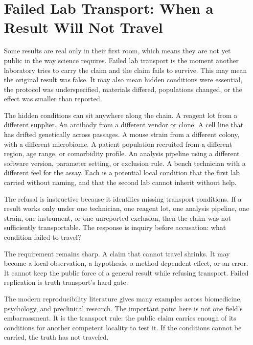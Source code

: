 \section{Failed Lab Transport: When a Result Will Not Travel}

Some results are real only in their first room, which means they are not
yet public in the way science requires. Failed lab transport is the
moment another laboratory tries to carry the claim and the claim fails
to survive. This may mean the original result was false. It may also
mean hidden conditions were essential, the protocol was underspecified,
materials differed, populations changed, or the effect was smaller than
reported.

The hidden conditions can sit anywhere along the chain. A reagent lot
from a different supplier. An antibody from a different vendor or clone.
A cell line that has drifted genetically across passages. A mouse strain
from a different colony, with a different microbiome. A patient
population recruited from a different region, age range, or comorbidity
profile. An analysis pipeline using a different software version,
parameter setting, or exclusion rule. A bench technician with a
different feel for the assay. Each is a potential local condition that
the first lab carried without naming, and that the second lab cannot
inherit without help.

The refusal is instructive because it identifies missing transport
conditions. If a result works only under one technician, one reagent
lot, one analysis pipeline, one strain, one instrument, or one
unreported exclusion, then the claim was not sufficiently transportable.
The response is inquiry before accusation: what condition failed to
travel?

The requirement remains sharp. A claim that cannot travel shrinks. It
may become a local observation, a hypothesis, a method-dependent effect,
or an error. It cannot keep the public force of a general result while
refusing transport. Failed replication is truth transport's hard gate.

The modern reproducibility literature gives many examples across
biomedicine, psychology, and preclinical research. The important point
here is not one field's embarrassment. It is the transport rule: the
public claim carries enough of its conditions for another competent
locality to test it. If the conditions cannot be carried, the truth has
not traveled.

